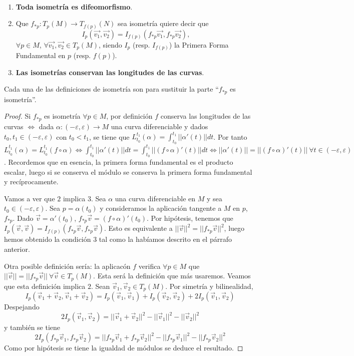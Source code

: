 \documentclass[twoside]{report}
\begin{document}
\begin{nota}

\

\begin{enumerate}
\item \textbf{Toda isometría es difeomorfismo}.

\item
Que $f_{*p}: T_p (M)\rightarrow T_{f(p)}(N)$ sea isometría quiere decir que $$I_p (\overrightarrow{v_1},\overrightarrow{v_2}) = I_{f(p)}(f_{*p}\overrightarrow{v_1},f_{*p}\overrightarrow{v_2}),$$ $\forall p \in M$, $\forall \overrightarrow{v_1},\overrightarrow{v_2} \in T_p(M)$, siendo $I_p$ (resp. $I_{f(p)}$) la Primera Forma Fundamental en $p$ (resp. $f(p)$).
\item \textbf{Las isometrías conservan las longitudes de las curvas}.
\end{enumerate}

Cada una de las definiciones de isometría son para sustituir la parte ``$f_{*p}$ es isometría''.

\begin{proof}
Si $f_{*p}$ es isometría $\forall p\in M$, por definición $f$ conserva las longitudes de las curvas $\Leftrightarrow$ dada $\alpha:(-\varepsilon,\varepsilon)\to M$ una curva diferenciable y dados $t_0,t_1\in (-\varepsilon,\varepsilon)$ con $t_0<t_1$, se tiene que $L_{t_0}^{t_1}(\alpha)=\int_{t_0}^{t_1}||\alpha'(t)||dt$. Por tanto $ L_{t_0}^{t_1}(\alpha)=L_{t_0}^{t_1}(f\circ\alpha)\Leftrightarrow\int_{t_0}^{t_1}||\alpha'(t)||dt=\int_{t_0}^{t_1}||(f \circ\alpha)'(t)||dt\Leftrightarrow ||\alpha'(t)||=||(f\circ\alpha)'(t)||\ \forall t\in (-\varepsilon,\varepsilon)$. Recordemos que en esencia, la primera forma fundamental es el producto escalar, luego si se conserva el módulo se conserva la primera forma fundamental y recíprocamente.

Vamos a ver que $2$ implica $3$. Sea $\alpha$ una curva diferenciable en $M$ y sea $t_0\in(-\varepsilon,\varepsilon)$. Sea $p=\alpha(t_0)$ y consideramos la aplicación tangente a $M$ en $p$, $f_{*p}$. Dado $\vec{v}=\alpha'(t_0)$, $f_{*p}\vec{v}=(f\circ\alpha)'(t_0)$. Por hipótesis, tenemos que $I_p(\vec{v},\vec{v})=I_{f(p)}(f_{*p}\vec{v},f_{*p}\vec{v})$. Esto es equivalente a $||\vec{v}||^2=||f_{*p}\vec{v}||^2$, luego hemos obtenido la condición $3$ tal como la habíamos descrito en el párrafo anterior.

Otra posible definición sería: la aplicacón $f$ verifica $\forall p\in M$ que $||\vec{v}||=||f_{*p}\vec{v}||\ \forall\vec{v}\in T_p(M)$. Esta será la definición que más usaremos. Veamos que esta definición implica $2$.  Sean $\vec{v}_1,\vec{v}_2\in T_p(M)$. Por simetría y bilinealidad, 
$$I_p(\vec{v}_1+\vec{v}_2,\vec{v}_1+\vec{v}_2)=I_p(\vec{v}_1,\vec{v}_1)+I_p(\vec{v}_2,\vec{v}_2)+2I_p(\vec{v}_1,\vec{v}_2)$$
Despejando
$$2I_p(\vec{v}_1,\vec{v}_2)=||\vec{v}_1+\vec{v}_2||^2-||\vec{v}_1||^2-||\vec{v}_2||^2$$
y también se tiene
$$2I_p(f_{*p}\vec{v}_1,f_{*p}\vec{v}_2)=||f_{*p}\vec{v}_1+f_{*p}\vec{v}_2||^2-||f_{*p}\vec{v}_1||^2-||f_{*p}\vec{v}_2||^2$$
Como por hipótesis se tiene la igualdad de módulos se deduce el resultado.
\end{proof}
\end{nota}
\end{document}
